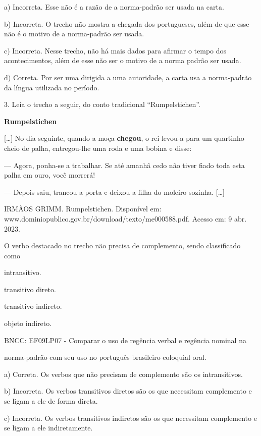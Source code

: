 a) Incorreta. Esse não é a razão de a norma-padrão ser usada na carta.

b) Incorreta. O trecho não mostra a chegada dos portugueses, além de que
esse não é o motivo de a norma-padrão ser usada.

c) Incorreta. Nesse trecho, não há mais dados para afirmar o tempo dos
acontecimentos, além de esse não ser o motivo de a norma padrão ser
usada.

d) Correta. Por ser uma dirigida a uma autoridade, a carta usa a
norma-padrão da língua utilizada no período.

3. Leia o trecho a seguir, do conto tradicional ``Rumpelstichen''.

\textbf{Rumpelstichen}

{[}\ldots{}{]} No dia seguinte, quando a moça \textbf{chegou}, o rei
levou-a para um quartinho cheio de palha, entregou-lhe uma roda e uma
bobina e disse:

--- Agora, ponha-se a trabalhar. Se até amanhã cedo não tiver fiado toda
esta palha em ouro, você morrerá!

--- Depois saiu, trancou a porta e deixou a filha do moleiro sozinha.
{[}\ldots{}{]}

IRMÃOS GRIMM. Rumpelstichen. Disponível em:
www.dominiopublico.gov.br/download/texto/me000588.pdf. Acesso em: 9 abr.
2023.

O verbo destacado no trecho não precisa de complemento, sendo
classificado como

\begin{escolha}
\item intransitivo.

\item transitivo direto.

\item transitivo indireto.

\item objeto indireto.

\end{escolha}BNCC: EF09LP07 - Comparar o uso de regência verbal e regência nominal na

norma-padrão com seu uso no português brasileiro coloquial oral.

a) Correta. Os verbos que não precisam de complemento são os
intransitivos.

b) Incorreta. Os verbos transitivos diretos são os que necessitam
complemento e se ligam a ele de forma direta.

c) Incorreta. Os verbos transitivos indiretos são os que necessitam
complemento e se ligam a ele indiretamente.

